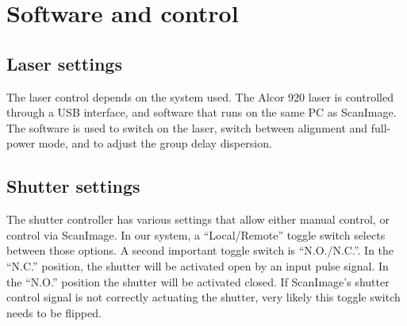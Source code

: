 \documentclass[10pt,letterpaper]{article}
\begin{document}
\section{Software and control}
%
\subsection{Laser settings}
The laser control depends on the system used. The Alcor 920 laser is controlled through a USB interface, and software that runs on the same PC as ScanImage. The software is used to switch on the laser, switch between alignment and full-power mode, and to adjust the group delay dispersion. 

\subsection{Shutter settings}
The shutter controller has various settings that allow either manual control, or control via ScanImage. In our system, a ``Local/Remote'' toggle switch selects between those options. A second important toggle switch is ``N.O./N.C.''. In the ``N.C.'' position, the shutter will be activated open by an input pulse signal. In the ``N.O.'' position the shutter will be activated closed. If ScanImage's shutter control signal is not correctly actuating the shutter, very likely this toggle switch needs to be flipped.
%
\end{document}
